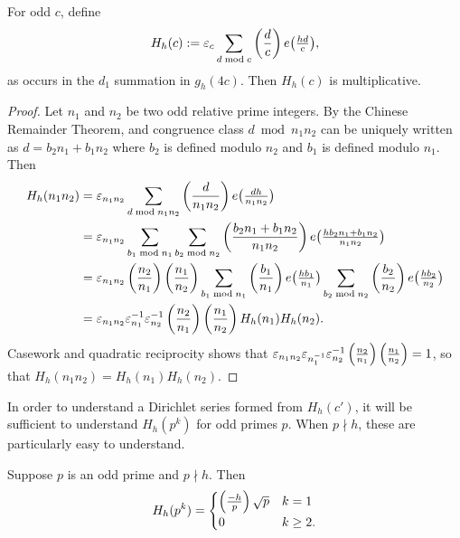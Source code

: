 \begin{lemma}\label{lem:back:Hh_multiplicative}
  For odd $c$, define
  \begin{equation}
    H_h(c) := \varepsilon_c \sum_{d \bmod c} \left(\frac{d}{c}\right) e \big( \tfrac{h d}{c} \big),
  \end{equation}
  as occurs in the $d_1$ summation in $g_h(4c)$.
  Then $H_h(c)$ is multiplicative.
\end{lemma}


\begin{proof}


Let $n_1$ and $n_2$ be two odd relative prime integers.
By the Chinese Remainder Theorem, and congruence class $d \bmod n_1 n_2$ can be uniquely
written as $d = b_2 n_1 + b_1 n_2$ where $b_2$ is defined modulo $n_2$ and $b_1$ is
defined modulo $n_1$.
Then
\begin{align}
  H_h(n_1 n_2)
  &=
  \varepsilon_{n_1 n_2} \sum_{d \bmod n_1n_2} \left(\frac{d}{n_1n_2}\right)
  e\big(\tfrac{d h}{n_1 n_2} \big)
  \\
  &= \varepsilon_{n_1 n_2} \sum_{b_1 \bmod n_1} \sum_{b_2 \bmod n_2}
  \left(\frac{b_2 n_1 +b_1 n_2}{n_1 n_2}\right)  e \big( \tfrac{h b_2 n_1 +b_1 n_2}{n_1 n_2} \big)
  \\
  &= \varepsilon_{n_1 n_2}\left(\frac{n_2}{n_1}\right) \left(\frac{n_1}{n_2}\right)
  \sum_{b_1 \bmod n_1} \left(\frac{b_1}{n_1}\right) e\big( \tfrac{h b_1}{n_1} \big)
  \sum_{b_2 \bmod n_2} \left(\frac{b_2}{n_2}\right) e\big( \tfrac{h b_2}{n_2} \big)
  \\
  &= \varepsilon_{n_1 n_2} \varepsilon_{n_1}^{-1} \varepsilon_{n_2}^{-1}
  \left(\frac{n_2}{n_1}\right) \left(\frac{n_1}{n_2}\right) H_h(n_1) H_{h}(n_2).
\end{align}
Casework and quadratic reciprocity shows that
$\varepsilon_{n_1n_2} \varepsilon_{n_1^{-1}} \varepsilon_{n_2}^{-1}
\left(\frac{n_2}{n_1}\right)\left(\frac{n_1}{n_2}\right)= 1$,
so that $H_h(n_1 n_2) = H_h(n_1) H_h(n_2)$.
%
\end{proof}


In order to understand a Dirichlet series formed from $H_h(c')$, it will be sufficient to
understand $H_h(p^k)$ for odd primes $p$.
When $p \nmid h$, these are particularly easy to understand.


\begin{lemma}\label{lem:back:Hh_goodp_eval}
  Suppose $p$ is an odd prime and $p \nmid h$.
  Then
  \begin{equation}
    H_h(p^k) = \begin{cases}
      \left(\frac{-h}{p}\right) \sqrt p & k = 1 \\
      0 & k \geq 2.
    \end{cases}
  \end{equation}
\end{lemma}



